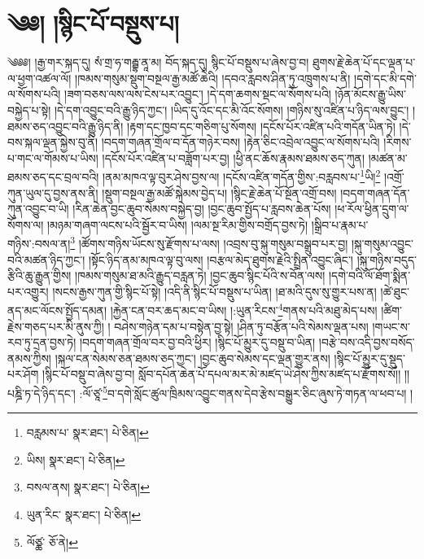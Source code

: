 \setcounter{footnote}{0} 
\chapter{༄༅། །སྙིང་པོ་བསྡུས་པ།}༄༅༅། །རྒྱ་གར་སྐད་དུ། སཾ་གྲ་ཧ་གརྦྷ་ནཱ་མ། བོད་སྐད་དུ། སྙིང་པོ་བསྡུས་པ་ཞེས་བྱ་བ། ཐུགས་རྗེ་ཆེན་པོ་དང་ལྡན་པ་ལ་ཕྱག་འཚལ་ལོ། །ཁམས་གསུམ་སྡུག་བསྔལ་རྒྱ་མཚོ་ཆེའི། །དབའ་རླབས་ཤིན་ཏུ་འཁྲུགས་པ་ནི། །དགེ་དང་མི་དགེ་ལ་སོགས་པའི། །ཟག་བཅས་ལས་ལས་ངེས་པར་འབྱུང་། །དེ་དག་ཆགས་སྡང་ལ་སོགས་པའི། །ཉོན་མོངས་རྒྱུ་ཡིས་བསྐྱེད་པ་སྟེ། །དེ་དག་འབྱུང་བའི་རྒྱུ་ཉིད་ཀྱང་། །ཡིད་དུ་འོང་དང་མི་འོང་སོགས། །གཉིས་སུ་འཛིན་པ་ཉིད་ལས་བྱུང་། །ཐམས་ཅད་འབྱུང་བའི་རྒྱུ་ཉིད་ནི། །རྟག་དང་ཁྱབ་དང་གཅིག་པུ་སོགས། །དངོས་པོར་འཛིན་པའི་གདོན་ཡིན་ཏེ། །དེ་བས་སྐལ་ལྡན་སྐྱེས་བུ་ནི། །བདག་གཞན་གྲོལ་བ་དོན་གཉེར་བས། །རྟེན་ཅིང་འབྲེལ་འབྱུང་ལ་སོགས་པའི། །རིགས་པ་གང་ལ་གོམས་པ་ཡིས། །དངོས་པོར་འཛིན་པ་བཟློག་པར་བྱ། །ཕྱི་ནང་ཆོས་རྣམས་ཐམས་ཅད་ཀུན། །མཚན་མ་ཐམས་ཅད་དང་བྲལ་བའི། །ནམ་མཁའ་ལྟ་བུར་ཤེས་བྱས་ལ། །དངོས་འཛིན་གདོན་གྱིས་:བརླབས་པ་\footnote{བརླམས་པ་  སྣར་ཐང་།  པེ་ཅིན། }ཡི།\footnote{ཡིས།  སྣར་ཐང་།  པེ་ཅིན། } །འགྲོ་ཀུན་ཡུལ་དུ་བྱས་ནས་ནི། །སྡུག་བསྔལ་རྒྱ་མཚོ་སྐེམས་བྱེད་པ། །སྙིང་རྗེ་ཆེན་པོ་སྔོན་འགྲོ་བས། །བདག་གཞན་དོན་ཀུན་འབྱུང་བ་ཡི། །རིན་ཆེན་བྱང་ཆུབ་སེམས་བསྐྱེད་བྱ། །བྱང་ཆུབ་སྤྱོད་པ་རླབས་ཆེན་པོས། །ཕ་རོལ་ཕྱིན་དྲུག་ལ་སོགས་ལ། །མཉམ་གཞག་ལངས་པའི་སྦྱོར་བ་ཡིས། །ལམ་སྔ་རིམ་གྱིས་བགྲོད་བྱས་ཏེ། །སྒྲིབ་པ་རྣམ་པ་གཉིས་:བསལ་ན།\footnote{བསལ་ནས།  སྣར་ཐང་།  པེ་ཅིན། } །ཚོགས་གཉིས་ཡོངས་སུ་རྫོགས་པ་ལས། །འབྲས་བུ་སྐུ་གསུམ་བསྒྲུབ་པར་བྱ། །སྐུ་གསུམ་འབྱུང་བའི་མཚན་ཉིད་ཀྱང་། །སྟོང་ཉིད་ནམ་མཁའ་ལྟ་བུ་ལས། །བརྩལ་མེད་ཐུགས་རྗེའི་སྤྲིན་འབྱུང་ཞིང་། །སྐུ་གཉིས་བདུད་རྩིའི་ཆུ་རྒྱུན་གྱིས། །ཁམས་གསུམ་ཐ་མའི་རྒྱུད་བརླན་ཏེ། །བྱང་ཆུབ་སྙིང་པོའི་ས་བོན་ལས། །དགེ་བའི་ལོ་ཐོག་སྨིན་པར་འགྱུར། །སངས་རྒྱས་ཀུན་གྱི་སྙིང་པོ་སྟེ། །འདི་ནི་སྙིང་པོ་བསྡུས་པ་ཡིན། །ཐ་མའི་དུས་སུ་གྱུར་པས་ན། །ཚེ་ཐུང་ནད་མང་ལོངས་སྤྱོད་དམན། །རྐྱེན་ངན་བར་ཆད་མང་བ་ཡིས། །:ཡུན་རིངས་\footnote{ཡུན་རིང་  སྣར་ཐང་།  པེ་ཅིན། }གནས་པའི་མཐུ་མེད་པས། །ཚིག་རྗེས་གཅད་པར་མི་ནུས་ཀྱི། །
བཤེས་གཉེན་དམ་པ་བསྟེན་བྱ་སྟེ། །ཤིན་ཏུ་བརྩོན་པའི་སེམས་ལྡན་པས། །གཡང་ས་རབ་ཏུ་དྲན་བྱས་ཏེ། །བདག་གཞན་གྲོལ་བར་བྱ་བའི་ཕྱིར། །སྙིང་པོ་མྱུར་དུ་བསྡུ་བ་ཡིན། །བརྩེ་བས་འདི་བྱས་བསོད་ནམས་ཀྱིས། །སྐལ་ངན་སེམས་ཅན་ཐམས་ཅད་ཀྱང་། །བྱང་ཆུབ་སེམས་དང་ལྡན་གྱུར་ནས། །སྙིང་པོ་མྱུར་དུ་སྡུད་པར་ཤོག །སྙིང་པོ་བསྡུ་བ་ཞེས་བྱ་བ། སློབ་དཔོན་ཆེན་པོ་དཔལ་མར་མེ་མཛད་ཡེ་ཤེས་ཀྱིས་མཛད་པ་རྫོགས་སོ།། །།པཎྜི་ཏ་དེ་ཉིད་དང་། :ལོ་ཙཱ་\footnote{ལོཙྪ་  ཅོ་ནེ། }བ་དགེ་སློང་ཚུལ་ཁྲིམས་འབྱུང་གནས་དེབ་རྩེས་བསྒྱུར་ཅིང་ཞུས་ཏེ་གཏན་ལ་ཕབ་པ། ། 